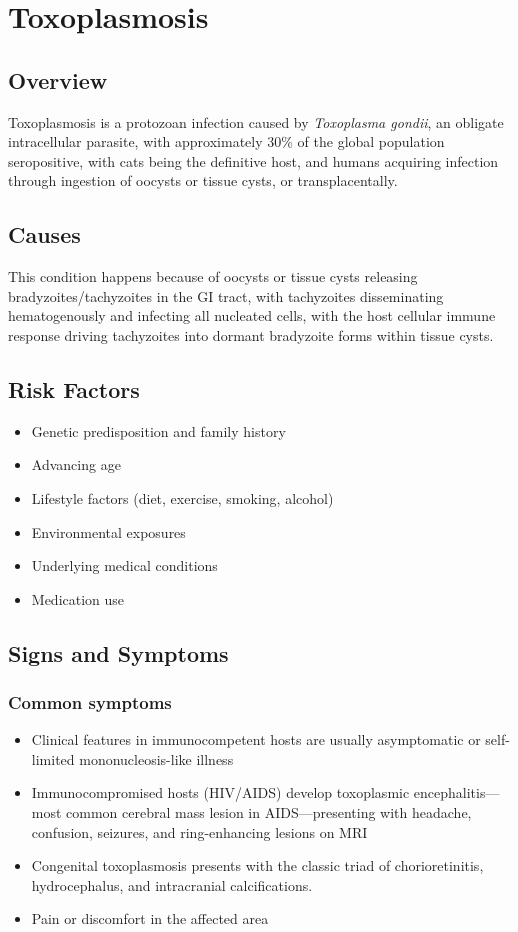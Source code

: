 \chapter{Toxoplasmosis}
\label{sec:Toxoplasmosis}

\section{Overview}
Toxoplasmosis is a protozoan infection caused by \textit{Toxoplasma gondii}, an obligate intracellular parasite, with approximately 30\% of the global population seropositive, with cats being the definitive host, and humans acquiring infection through ingestion of oocysts or tissue cysts, or transplacentally.
\section{Causes}
This condition happens because of oocysts or tissue cysts releasing bradyzoites/tachyzoites in the GI tract, with tachyzoites disseminating hematogenously and infecting all nucleated cells, with the host cellular immune response driving tachyzoites into dormant bradyzoite forms within tissue cysts.     
\section{Risk Factors}

\begin{itemize}[noitemsep]
  \item Genetic predisposition and family history
  \item Advancing age
  \item Lifestyle factors (diet, exercise, smoking, alcohol)
  \item Environmental exposures
  \item Underlying medical conditions
  \item Medication use
\end{itemize}
\section{Signs and Symptoms}

\subsection{Common symptoms}
\begin{itemize}[noitemsep]
  \item Clinical features in immunocompetent hosts are usually asymptomatic or self-limited mononucleosis-like illness
  \item Immunocompromised hosts (HIV/AIDS) develop toxoplasmic encephalitis---most common cerebral mass lesion in AIDS---presenting with headache, confusion, seizures, and ring-enhancing lesions on MRI
  \item Congenital toxoplasmosis presents with the classic triad of chorioretinitis, hydrocephalus, and intracranial calcifications.
  \item Pain or discomfort in the affected area
  \end{itemize}

